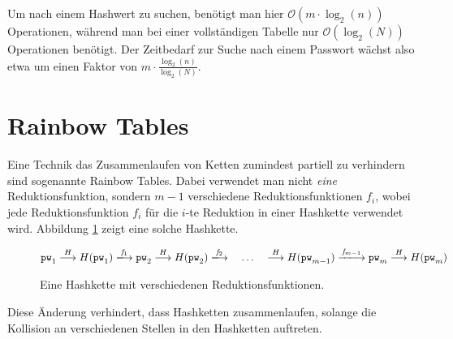 Um nach einem Hashwert zu suchen, benötigt man hier $\mathcal{O}(m \cdot \log_2(n))$ Operationen, während man bei einer vollständigen Tabelle nur $\mathcal{O}(\log_2(N))$ Operationen benötigt. Der Zeitbedarf zur Suche nach einem Passwort wächst also etwa um einen Faktor von $m \cdot \frac{\log_2(n)}{\log_2(N)}$.

\section{Rainbow Tables}

Eine Technik das Zusammenlaufen von Ketten zumindest partiell zu verhindern sind sogenannte Rainbow Tables. Dabei verwendet man nicht \emph{eine} Reduktionsfunktion, sondern $m-1$ verschiedene Reduktionsfunktionen $f_i$, wobei jede Reduktionsfunktion $f_i$ für die $i$-te Reduktion in einer Hashkette verwendet wird. Abbildung \ref{fig:auth:rainbowhashchain} zeigt eine solche Hashkette.

\begin{figure}[h]
	\begin{equation*}
		\pw_1 \hasharrow H(\pw_1)
		\VRTF[1] \pw_2 \hasharrow H(\pw_2)
		\VRTF[2] %
		\quad \ldots \quad 
		\hasharrow H(\pw_{m-1})
		\VRTF[m-1] \pw_m \hasharrow H(\pw_m)
	\end{equation*}
	\caption{Eine Hashkette mit verschiedenen Reduktionsfunktionen.}
	\label{fig:auth:rainbowhashchain}
\end{figure}

Diese Änderung verhindert, dass Hashketten zusammenlaufen, solange die Kollision an verschiedenen Stellen in den Hashketten auftreten.\\

